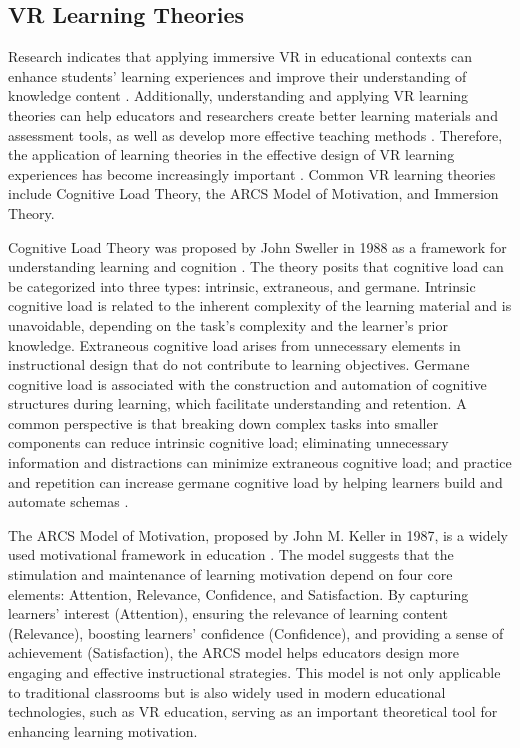 \documentclass[runningheads]{llncs}
\begin{document}
\subsection{VR Learning Theories}
Research indicates that applying immersive VR in educational contexts can enhance students' learning experiences and improve their understanding of knowledge content \cite{freina2015literature}. Additionally, understanding and applying VR learning theories can help educators and researchers create better learning materials and assessment tools, as well as develop more effective teaching methods \cite{matovu2023immersive}. Therefore, the application of learning theories in the effective design of VR learning experiences has become increasingly important \cite{marougkas2023virtual}. Common VR learning theories include Cognitive Load Theory, the ARCS Model of Motivation, and Immersion Theory.

Cognitive Load Theory was proposed by John Sweller in 1988 as a framework for understanding learning and cognition \cite{sweller1988cognitive}. The theory posits that cognitive load can be categorized into three types: intrinsic, extraneous, and germane. Intrinsic cognitive load is related to the inherent complexity of the learning material and is unavoidable, depending on the task's complexity and the learner's prior knowledge. Extraneous cognitive load arises from unnecessary elements in instructional design that do not contribute to learning objectives. Germane cognitive load is associated with the construction and automation of cognitive structures during learning, which facilitate understanding and retention. A common perspective is that breaking down complex tasks into smaller components can reduce intrinsic cognitive load; eliminating unnecessary information and distractions can minimize extraneous cognitive load; and practice and repetition can increase germane cognitive load by helping learners build and automate schemas \cite{baceviciute2022investigating}.

The ARCS Model of Motivation, proposed by John M. Keller in 1987, is a widely used motivational framework in education \cite{keller1987development}. The model suggests that the stimulation and maintenance of learning motivation depend on four core elements: Attention, Relevance, Confidence, and Satisfaction. By capturing learners' interest (Attention), ensuring the relevance of learning content (Relevance), boosting learners' confidence (Confidence), and providing a sense of achievement (Satisfaction), the ARCS model helps educators design more engaging and effective instructional strategies. This model is not only applicable to traditional classrooms but is also widely used in modern educational technologies, such as VR education, serving as an important theoretical tool for enhancing learning motivation.
\end{document}
